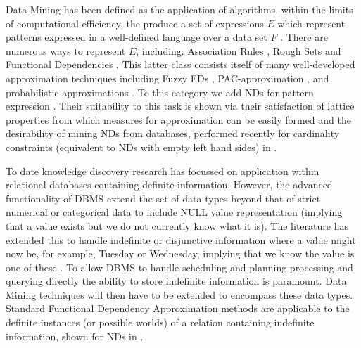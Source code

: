 Data Mining has been defined as the application of algorithms, within
the limits of computational efficiency, the produce a set of
expressions $E$ which represent patterns expressed in a well-defined
language over a data set $F$ \cite{kdd96}. There are numerous ways to
represent $E$, including: Association Rules \cite{ais93,toi96b}, Rough
Sets \cite{ziar91,incunc93} and Functional Dependencies \cite{km95}. This
latter class consists itself of many well-developed approximation
techniques including Fuzzy FDs \cite{bdp94}, PAC-approximation
\cite{at94,km95}, and probabilistic approximations
\cite{psm93,pk95,hkp98}. To this category we add NDs for pattern
expression \cite{cl98}. Their suitability to this task is shown via
their satisfaction of lattice properties from which measures for
approximation can be easily formed and the desirability of
mining NDs from databases, performed recently for cardinality
constraints (equivalent to NDs with empty left hand sides) in \cite{sou98}.

\medskip

To date knowledge discovery research has focussed on application
within relational databases containing definite information. However,
the advanced functionality of DBMS extend the set of
data types beyond that of strict numerical or categorical data to
include NULL value representation \cite{lip79,il84} (implying that a value
exists but we do not currently know what it is). The literature has
extended this to handle indefinite or disjunctive information where a
value might now be, for example, Tuesday or Wednesday, implying that
we know the value is one of these \cite{inv91,vn95}.  To allow DBMS to
handle scheduling 
and planning processing and querying directly the ability to store 
indefinite information is paramount. Data Mining techniques will then
have to be extended to encompass these data types. Standard Functional
Dependency Approximation methods are applicable to the definite
instances (or possible worlds) of a relation containing indefinite
information, shown for NDs in \cite{cl98}.

\medskip
{}

